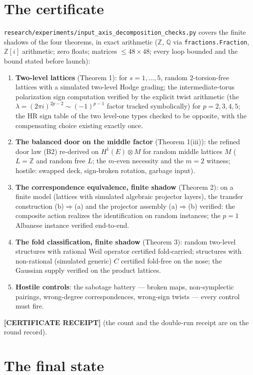 \documentclass[11pt]{article}
\newcommand{\CERT}{\textbf{[CERTIFICATE RECEIPT]}}
\newcommand{\Z}{\mathbb{Z}}
\newcommand{\Q}{\mathbb{Q}}
\begin{document}
\section{The certificate}

\texttt{research/experiments/input\_axis\_decomposition\_checks.py} covers the
finite shadows of the four theorems, in exact arithmetic ($\Z$, $\Q$ via
\texttt{fractions.Fraction}, $\Z[i]$ arithmetic; zero floats; matrices
$\le 48\times48$; every loop bounded and the bound stated before launch):
\begin{enumerate}[label=(C\arabic*)]
\item \textbf{Two-level lattices} (Theorem 1): for $s=1,\dots,5$, random
2-torsion-free lattices with a simulated two-level Hodge grading; the
intermediate-torus polarization sign computation verified by the explicit
twist arithmetic (the $\lambda=(2\pi i)^{2p-2}\sim(-1)^{p-1}$ factor tracked
symbolically) for $p=2,3,4,5$; the HR sign table of the two level-one types
checked to be opposite, with the compensating choice existing exactly once.
\item \textbf{The balanced door on the middle factor} (Theorem 1(iii)): the
refined door law (B2) re-derived on $H^1(E)\otimes M$ for random middle
lattices $M$ ($L=\Z$ and random free $L$; the $m$-even necessity and the
$m=2$ witness; hostile: swapped deck, sign-broken rotation, garbage input).
\item \textbf{The correspondence equivalence, finite shadow} (Theorem 2): on a
finite model (lattices with simulated algebraic projector layers), the
transfer construction (b)$\Rightarrow$(a) and the projector assembly
(a)$\Rightarrow$(b) verified: the composite action realizes the
identification on random instances; the $p=1$ Albanese instance verified
end-to-end.
\item \textbf{The fold classification, finite shadow} (Theorem 3): random
two-level structures with rational Weil operator certified fold-carried;
structures with non-rational (simulated generic) $C$ certified fold-free on
the nose; the Gaussian supply verified on the product lattices.
\item \textbf{Hostile controls}: the sabotage battery --- broken maps,
non-symplectic pairings, wrong-degree correspondences, wrong-sign twists
--- every control must fire.
\end{enumerate}
\CERT{} (the count and the double-run receipt are on the round record).

\section{The final state}
\end{document}
